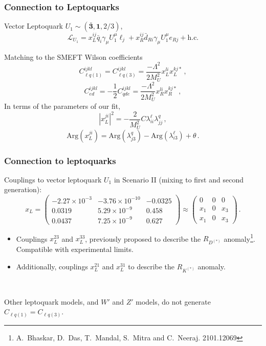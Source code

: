 \documentclass[mathserif, 10pt]{beamer}
\begin{document}
\begin{frame}
    \frametitle{Connection to Leptoquarks}

    Vector Leptoquark $U_1 \sim (\bar{\mathbf{3}}, \mathbf{1}, 2/3)$,
    $$\mathcal{L}_{U_1} = x_L^{ij} \bar{q}_i \gamma_\mu U_1^\mu \ell_j + x_R^{ij} \bar{d}_{Ri} \gamma_\mu U_1^\mu e_{Rj} + \mathrm{h.c.} $$

    Matching to the SMEFT Wilson coefficients
    $$C_{\ell q(1)}^{ijkl} = C_{\ell q(3)}^{ijkl} = \frac{-\Lambda^2}{2M_U^2}x_L^{li}x_L^{kj*}\,,$$
    $$C_{ed}^{ijkl} = -\frac{1}{2}C_{qde}^{ijkl} = \frac{-\Lambda^2}{2M_U^2}x_R^{li}x_R^{kj*}\,,$$
    In terms of the parameters of our fit,
    $$|x_L^{ji}|^2 = -\frac{2}{M_U^2}C\lambda^\ell_{ii}\lambda^q_{jj}\,,$$
    $$\mathrm{Arg}(x_L^{ji}) = \mathrm{Arg}(\lambda_{j3}^q)-\mathrm{Arg}(\lambda_{i3}^\ell) + \theta\,.$$ %

\end{frame}

\begin{frame}
    \frametitle{Connection to leptoquarks}

    Couplings to vector leptoquark $U_1$ in Scenario II (mixing to first and second generation):
    $$x_L = \begin{pmatrix}
        -2.27\times10^{-3} & -3.76\times 10^{-10}  & -0.0325 \\
        0.0319 & 5.29\times 10^{-9} &  0.458\\
        0.0437  & 7.25\times 10^{-9}  & 0.627
        \end{pmatrix} \approx \begin{pmatrix}
            0 & 0 & 0 \\ x_1 & 0 & x_3 \\ x_1 & 0 & x_3
        \end{pmatrix} \,.
    $$
    \begin{itemize}
        \item Couplings $x_L^{23}$ and $x_L^{33}$, previously proposed to describe the $R_{D^{(*)}}$ anomaly\footnote[1]{A.~Bhaskar, D.~Das, T.~Mandal, S.~Mitra and C.~Neeraj. 2101.12069}. Compatible with experimental limits.
        \item Additionally, couplings $x_L^{21}$ and $x_L^{31}$ to describe the $R_{K^{(*)}}$ anomaly. 
    \end{itemize}

    ~
    
    Other leptoquark models, and $W'$ and $Z'$ models, do not generate $C_{\ell q(1)} = C_{\ell q (3)}$. 
\end{frame}
\end{document}
